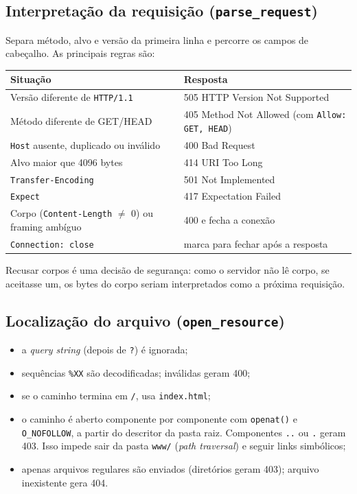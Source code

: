 \documentclass[11pt,a4paper]{article}
\begin{document}
\subsection{Interpretação da requisição (\texttt{parse\_request})}
Separa método, alvo e versão da primeira linha e percorre os campos de cabeçalho.
As principais regras são:

\begin{table}[h]
\centering
\begin{tabularx}{\linewidth}{@{}lX@{}}
\toprule
\textbf{Situação} & \textbf{Resposta} \\
\midrule
Versão diferente de \texttt{HTTP/1.1} & 505 HTTP Version Not Supported \\
Método diferente de GET/HEAD & 405 Method Not Allowed (com \texttt{Allow: GET, HEAD}) \\
\texttt{Host} ausente, duplicado ou inválido & 400 Bad Request \\
Alvo maior que 4096 bytes & 414 URI Too Long \\
\texttt{Transfer-Encoding} & 501 Not Implemented \\
\texttt{Expect} & 417 Expectation Failed \\
Corpo (\texttt{Content-Length} $\neq$ 0) ou framing ambíguo & 400 e fecha a conexão \\
\texttt{Connection: close} & marca para fechar após a resposta \\
\bottomrule
\end{tabularx}
\end{table}

Recusar corpos é uma decisão de segurança: como o servidor não lê corpo, se aceitasse
um, os bytes do corpo seriam interpretados como a próxima requisição.

\subsection{Localização do arquivo (\texttt{open\_resource})}
\begin{itemize}
  \item a \emph{query string} (depois de \texttt{?}) é ignorada;
  \item sequências \texttt{\%XX} são decodificadas; inválidas geram 400;
  \item se o caminho termina em \texttt{/}, usa \texttt{index.html};
  \item o caminho é aberto componente por componente com \texttt{openat()} e
  \texttt{O\_NOFOLLOW}, a partir do descritor da pasta raiz. Componentes \texttt{..} ou
  \texttt{.} geram 403. Isso impede sair da pasta \texttt{www/} (\emph{path traversal}) e
  seguir links simbólicos;
  \item apenas arquivos regulares são enviados (diretórios geram 403); arquivo inexistente gera 404.
\end{itemize}
\end{document}
